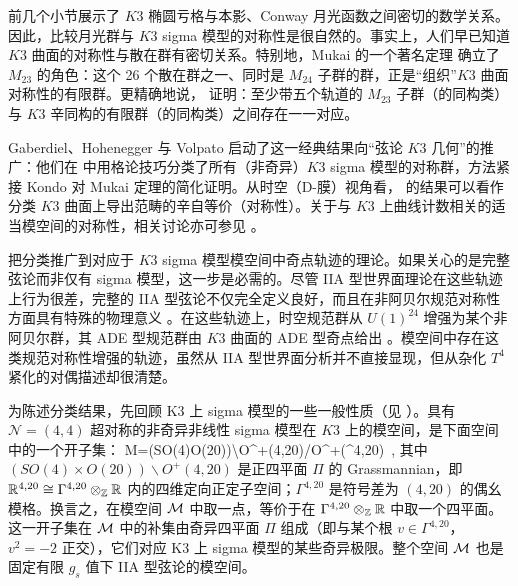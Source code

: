 前几个小节展示了 $K3$ 椭圆亏格与本影、Conway 月光函数之间密切的数学关系。因此，比较月光群与 $K3$ sigma 模型的对称性是很自然的。事实上，人们早已知道 $K3$ 曲面的对称性与散在群有密切关系。特别地，Mukai 的一个著名定理 \cite{Mukai} 确立了 $M_{23}$ 的角色：这个 26 个散在群之一、同时是 $M_{24}$ 子群的群，正是“组织”$K3$ 曲面对称性的有限群。更精确地说，\cite{Mukai} 证明：至少带五个轨道的 $M_{23}$ 子群（的同构类）与 $K3$ 辛同构的有限群（的同构类）之间存在一一对应。


Gaberdiel、Hohenegger 与 Volpato 启动了这一经典结果向“弦论 $K3$ 几何”的推广：他们在 \cite{Gaberdiel2011} 中用格论技巧分类了所有（非奇异）$K3$ sigma 模型的对称群，方法紧接 Kondo \cite{Kondo} 对 Mukai 定理的简化证明。从时空（D-膜）视角看，\cite{Gaberdiel2011} 的结果可以看作分类 $K3$ 曲面上导出范畴的辛自等价（对称性）\cite{MR3586514}。关于与 $K3$ 上曲线计数相关的适当模空间的对称性，相关讨论亦可参见 \cite{Cheng:2015kha}。

\cite{ChengMirandaC.N.2016KSTL} 把分类推广到对应于 $K3$ sigma 模型模空间中奇点轨迹的理论。如果关心的是完整弦论而非仅有 sigma 模型，这一步是必需的。尽管 IIA 型世界面理论在这些轨迹上行为很差，完整的 IIA 型弦论不仅完全定义良好，而且在非阿贝尔规范对称性方面具有特殊的物理意义 \cite{Aspinwall:1995zi}。在这些轨迹上，时空规范群从 $U(1)^{24}$ 增强为某个非阿贝尔群，其 ADE 型规范群由 $K3$ 曲面的 ADE 型奇点给出 \cite{Witten:1995ex,Aspinwall:1995zi}。模空间中存在这类规范对称性增强的轨迹，虽然从 IIA 型世界面分析并不直接显现，但从杂化 $T^4$ 紧化的对偶描述却很清楚。


为陈述分类结果，先回顾 K3 上 sigma 模型的一些一般性质（见 \cite{Aspinwall:1996mn,Nahm:1999ps}）。具有 $\mathcal{N}=(4,4)$ 超对称的非奇异非线性 sigma 模型在 $K3$ 上的模空间，是下面空间中的一个开子集：
\be \label{moduli_space}{\cal M}=(SO(4)\times O(20))\backslash O^+(4,20)/O^+(\Gamma^{4,20})\ ,
\ee
其中 $(SO(4)\times O(20))\backslash O^+(4,20)$ 是正四平面 $\Pi$ 的 Grassmannian，即 $\mathbb{R}^{4,20}\cong \Gamma^{4,20}\otimes_{\mathbb{Z}} \mathbb{R}$ 内的四维定向正定子空间；$\Gamma^{4,20}$ 是符号差为 $(4,20)$ 的偶幺模格。换言之，在模空间 ${\cal M}$ 中取一点，等价于在 $\Gamma^{4,20}\otimes_{\mathbb{Z}} \mathbb{R}$ 中取一个四平面。这一开子集在 $\mathcal{M}$ 中的补集由奇异四平面 $\Pi$ 组成（即与某个根 $v\in \Gamma^{4,20}$，$v^2=-2$ 正交），它们对应 K3 上 sigma 模型的某些奇异极限。整个空间 ${\cal M}$ 也是固定有限 $g_s$ 值下 IIA 型弦论的模空间。

